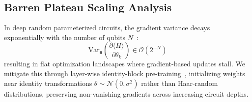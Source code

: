 \subsection{Barren Plateau Scaling Analysis}
In deep random parameterized circuits, the gradient variance decays exponentially with the number of qubits $N$~\cite{mcclean2018barren}:
\begin{equation}
    \mathrm{Var}_{\boldsymbol{\theta}}\left( \frac{\partial \langle H \rangle}{\partial \theta_k} \right) \in \mathcal{O}\left( 2^{-N} \right)
\end{equation}
resulting in flat optimization landscapes where gradient-based updates stall. We mitigate this through layer-wise identity-block pre-training~\cite{skolik2021layerwise}, initializing weights near identity transformations $\theta \sim \mathcal{N}(0, \sigma^2)$ rather than Haar-random distributions, preserving non-vanishing gradients across increasing circuit depths.
